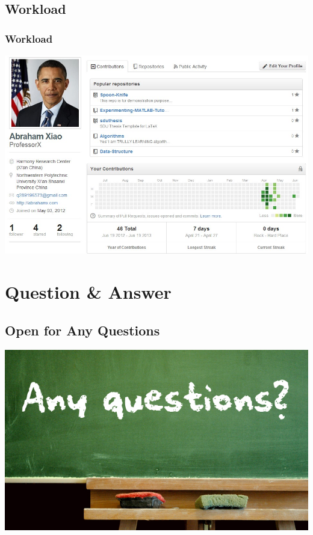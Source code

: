 \documentclass[12pt,hyperref=true,mathserif]{beamer}
\begin{document}
\subsection{Workload}
\begin{frame}
\frametitle{Workload}
\begin{center}
\includegraphics[scale=0.3]{Workload.jpg}
\end{center}
\end{frame}






\section{Question \& Answer}
\subsection{Open for Any Questions}
\begin{frame}
\begin{center}
\includegraphics[scale=0.45]{Question.jpg}
\end{center}
\end{frame}
\end{document}
